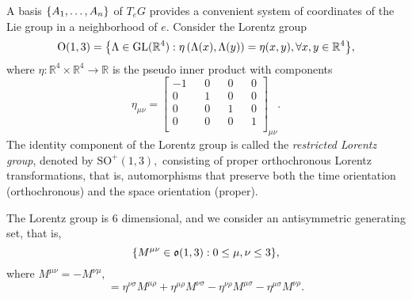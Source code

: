 \begin{example}
    A basis \(\{A_1, \dots, A_n\}\) of \(T_eG\) provides a convenient system of coordinates of the Lie group in a neighborhood of \(e\). Consider the Lorentz group
    \begin{equation*}
        \mathrm{O}(1,3) = \set*{\Lambda \in \mathrm{GL}(\mathbb{R}^4) : \eta\left(\Lambda(x), \Lambda(y)\right) = \eta(x,y), \forall x, y \in \mathbb{R}^4},
    \end{equation*}
    where \(\eta : \mathbb{R}^4 \times \mathbb{R}^4 \to \mathbb{R}\) is the pseudo inner product with components
    \begin{equation*}
        \eta_{\mu\nu} = \begin{bmatrix}
            -1 && 0 && 0 && 0 \\
            0 && 1 && 0 && 0 \\
            0 && 0 && 1 && 0 \\
            0 && 0 && 0 && 1 \\
        \end{bmatrix}_{\mu\nu}.
    \end{equation*}
    The identity component of the Lorentz group is called the \emph{restricted Lorentz group}, denoted by \(\mathrm{SO}^+(1,3),\) consisting of proper orthochronous Lorentz transformations, that is, automorphisms that preserve both the time orientation (orthochronous) and the space orientation (proper). 

    The Lorentz group is 6 dimensional, and we consider an antisymmetric generating set, that is,
    \begin{equation*}
        \{M^{\mu \nu} \in \mathfrak{o}(1,3): 0 \leq \mu, \nu \leq 3 \},
    \end{equation*}
    where \(M^{\mu \nu} = - M^{\nu \mu},\)
    \begin{equation*}
        [M^{\mu\nu}, M^{\rho\sigma}] = \eta^{\nu\sigma} M^{\mu\rho} + \eta^{\mu\rho} M^{\nu\sigma} - \eta^{\nu\rho} M^{\mu\sigma} - \eta^{\mu\sigma} M^{\nu\rho}.
    \end{equation*}


\end{example}
